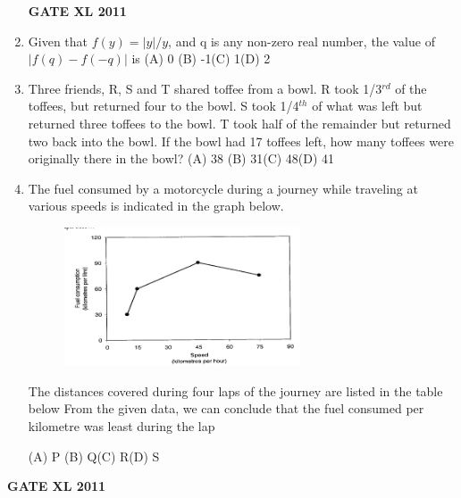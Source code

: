 \documentclass[journal,12pt,onecolumn]{IEEEtran}
\begin{document}
\begin{enumerate}
\begin{enumerate}
		\end{enumerate}\hfill{\textbf{GATE XL 2011}}

	\item{ 
Given that $f(y) =|y|/y$, and q is any non-zero real number, the value of $|f(q) - f(-q) |$ is
}
		\newline(A) 0 \hspace{10mm} (B) -1\hspace{10mm}(C) 1\hspace{10mm}(D) 2
	\item{ Three friends, R, S and T shared toffee from a bowl. R took 1/3$^{rd}$ of the toffees, but returned four to the bowl. S took 1/4$^{th}$ of what was left but returned three toffees to the bowl. T took half of the remainder but returned two back into the bowl. If the bowl had 17 toffees left, how many toffees were originally there in the bowl?}
	\newline(A) 38 \hspace{10mm} (B) 31\hspace{10mm}(C) 48\hspace{10mm}(D) 41
\item{ The fuel consumed by a motorcycle during a journey while traveling at various speeds is indicated in the graph below.
	\begin{figure}[h!]
	\centering
	\includegraphics[width=7cm]{10}
	\caption*{}
	\label{fig:Q10}
	\end{figure}
The distances covered during four laps of the journey are listed in the table below
From the given data, we can conclude that the fuel consumed per kilometre was least during the lap} 
\begin{table}[H]
\centering
	
	\caption*{}
	\label{10}
\end{table}

	
		(A) P \hspace{10mm} (B) Q\hspace{10mm}(C) R\hspace{10mm}(D) S
\end{enumerate}\hfill{\textbf{GATE XL 2011}}
	
\end{document}
